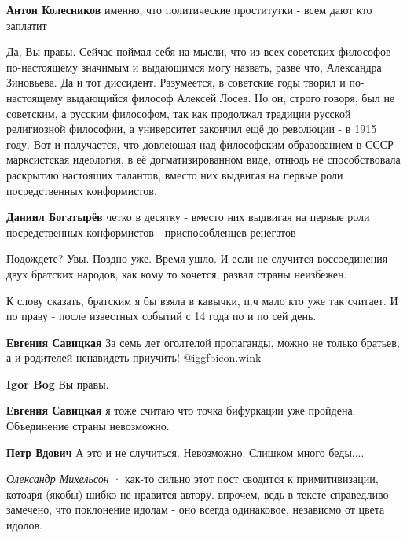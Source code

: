 \begin{itemize}
\textbf{Антон Колесников} именно, что политические проститутки - всем дают кто заплатит


Да, Вы правы. Сейчас поймал себя на мысли, что из всех советских философов
по-настоящему значимым и выдающимся могу назвать, разве что, Александра
Зиновьева. Да и тот диссидент. Разумеется, в советские годы творил и
по-настоящему выдающийся философ Алексей Лосев. Но он, строго говоря, был не
советским, а русским философом, так как продолжал традиции русской религиозной
философии, а университет закончил ещё до революции - в 1915 году. Вот и
получается, что довлеющая над философским образованием в СССР марксистская
идеология, в её догматизированном виде, отнюдь не способствовала раскрытию
настоящих талантов, вместо них выдвигая на первые роли посредственных
конформистов.


\textbf{Даниил Богатырёв} четко в десятку - вместо них выдвигая на первые роли посредственных конформистов - приспособленцев-ренегатов


Подождете? Увы. Поздно уже. Время ушло. И если не случится воссоединения двух
братских народов, как кому то хочется, развал страны неизбежен.

К слову сказать, братским я бы взяла в кавычки, п.ч мало кто уже так считает. И
по праву - после известных событий с 14 года по и по сей день.

\begin{itemize} %
\textbf{Евгения Савицкая} За семь лет оголтелой пропаганды, можно не только братьев, а и родителей ненавидеть приучить!  @igg{fbicon.wink} 

\textbf{Igor Bog}
Вы правы.

\textbf{Евгения Савицкая} я тоже считаю что точка бифуркации уже пройдена.
Объединение страны невозможно.

\textbf{Петр Вдович}
А это и не случиться. Невозможно. Слишком много беды....

\end{itemize} %

\emph{Олександр Михельсон}
  · 
как-то сильно этот пост сводится к примитивизации, котоаря (якобы) шибко не
нравится автору. впрочем, ведь в тексте справедливо замечено, что поклонение
идолам - оно всегда одинаковое, независмо от цвета идолов.


\end{itemize}
